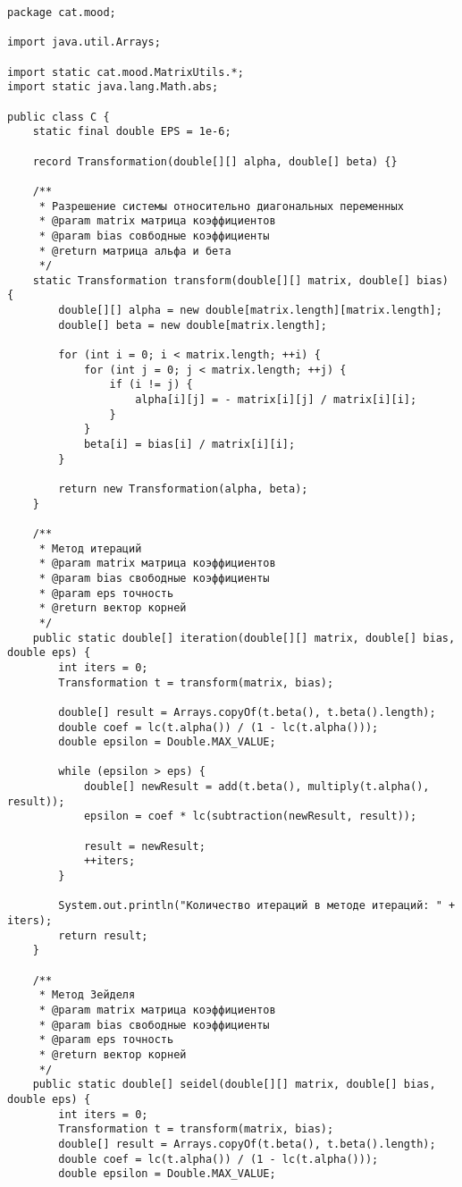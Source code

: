 \begin{verbatim}
package cat.mood;

import java.util.Arrays;

import static cat.mood.MatrixUtils.*;
import static java.lang.Math.abs;

public class C {
    static final double EPS = 1e-6;

    record Transformation(double[][] alpha, double[] beta) {}

    /**
     * Разрешение системы относительно диагональных переменных
     * @param matrix матрица коэффициентов
     * @param bias совбодные коэффициенты
     * @return матрица альфа и бета
     */
    static Transformation transform(double[][] matrix, double[] bias) {
        double[][] alpha = new double[matrix.length][matrix.length];
        double[] beta = new double[matrix.length];

        for (int i = 0; i < matrix.length; ++i) {
            for (int j = 0; j < matrix.length; ++j) {
                if (i != j) {
                    alpha[i][j] = - matrix[i][j] / matrix[i][i];
                }
            }
            beta[i] = bias[i] / matrix[i][i];
        }

        return new Transformation(alpha, beta);
    }

    /**
     * Метод итераций
     * @param matrix матрица коэффициентов
     * @param bias свободные коэффициенты
     * @param eps точность
     * @return вектор корней
     */
    public static double[] iteration(double[][] matrix, double[] bias, double eps) {
        int iters = 0;
        Transformation t = transform(matrix, bias);

        double[] result = Arrays.copyOf(t.beta(), t.beta().length);
        double coef = lc(t.alpha()) / (1 - lc(t.alpha()));
        double epsilon = Double.MAX_VALUE;

        while (epsilon > eps) {
            double[] newResult = add(t.beta(), multiply(t.alpha(), result));
            epsilon = coef * lc(subtraction(newResult, result));

            result = newResult;
            ++iters;
        }

        System.out.println("Количество итераций в методе итераций: " + iters);
        return result;
    }

    /**
     * Метод Зейделя
     * @param matrix матрица коэффициентов
     * @param bias свободные коэффициенты
     * @param eps точность
     * @return вектор корней
     */
    public static double[] seidel(double[][] matrix, double[] bias, double eps) {
        int iters = 0;
        Transformation t = transform(matrix, bias);
        double[] result = Arrays.copyOf(t.beta(), t.beta().length);
        double coef = lc(t.alpha()) / (1 - lc(t.alpha()));
        double epsilon = Double.MAX_VALUE;


\end{verbatim}
